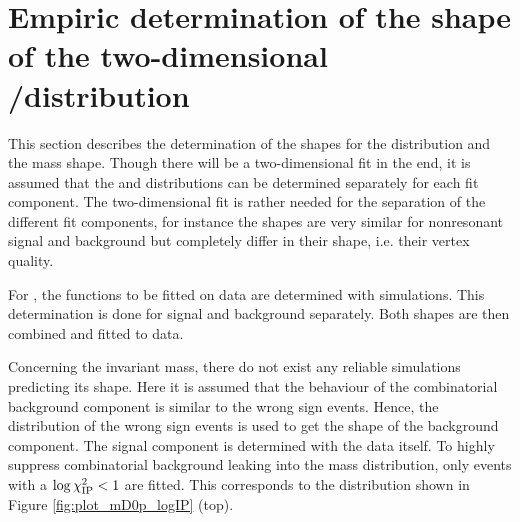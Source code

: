 \section{Empiric determination of the shape of the two-dimensional \logIP/\MDp distribution}
This section describes the determination of the shapes for the \logIP distribution and the \Dz\proton mass shape.
Though there will be a two-dimensional fit in the end, it is assumed that the \logIP and \MDp distributions can be determined separately for each fit component.
The two-dimensional fit is rather needed for the separation of the different fit components, for instance the \MDp shapes are very similar for nonresonant signal and background but completely differ in their \logIP shape, i.e. their vertex quality.

For \logIP, the functions to be fitted on data are determined with simulations.
This determination is done for signal and background separately.
Both shapes are then combined and fitted to data.

Concerning the invariant \Dz\proton mass, there do not exist any reliable simulations predicting its shape.
Here it is assumed that the behaviour of the combinatorial background component is similar to the wrong sign events.
Hence, the \MDp distribution of the wrong sign events is used to get the shape of the background component.
The signal component is determined with the data itself.
To highly suppress combinatorial background leaking into the \Dz\proton mass distribution, only events with a $\log \chi^2_{\text{IP}} < 1$ are fitted.
This corresponds to the distribution shown in Figure \ref{fig:plot_mD0p_logIP} (top).

